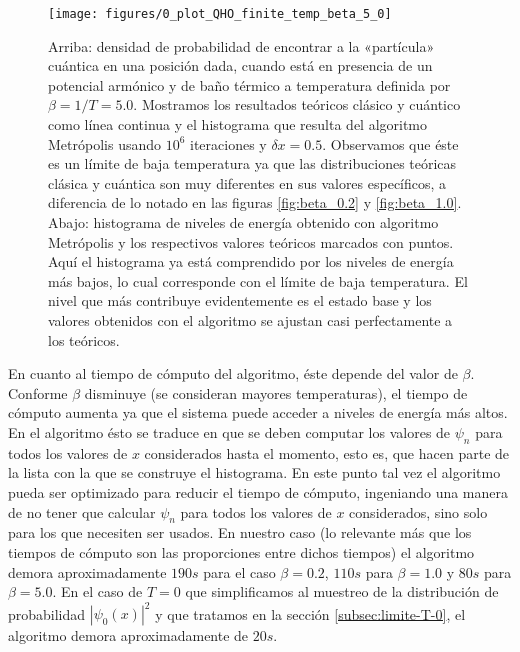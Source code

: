 \documentclass[%
 reprint,
 amsmath,amssymb,
 aps,
 pra,
]{revtex4-2}
\begin{document}
\begin{figure}[t]
	\centering
	\texttt{[image: figures/0\_plot\_QHO\_finite\_temp\_beta\_5\_0]}
	\caption{Arriba: densidad de probabilidad de encontrar a la «partícula» cuántica en una posición dada, cuando está en presencia de un potencial armónico y de baño térmico a temperatura definida por $\beta=1/T=5.0$. Mostramos los resultados teóricos clásico y cuántico como línea continua y el histograma que resulta del algoritmo Metrópolis usando $10^6$ iteraciones y $\delta x = 0.5$. Observamos que éste es un límite de baja temperatura ya que las distribuciones teóricas clásica y cuántica son muy diferentes en sus valores específicos, a diferencia de lo notado en las figuras \ref{fig:beta_0.2} y \ref{fig:beta_1.0}. Abajo: histograma de niveles de energía obtenido con algoritmo Metrópolis y los respectivos valores teóricos marcados con puntos. Aquí el histograma ya está comprendido por los niveles de energía más bajos, lo cual corresponde con el límite de baja temperatura. El nivel que más contribuye evidentemente es el estado base y los valores obtenidos con el algoritmo se ajustan casi perfectamente a los teóricos.}
	\label{fig:beta_5.0}
\end{figure}

En cuanto al tiempo de cómputo del algoritmo, éste depende del valor de $\beta$. Conforme $\beta$ disminuye (se consideran mayores temperaturas), el tiempo de cómputo aumenta ya que el sistema puede acceder a niveles de energía más altos. En el algoritmo ésto se traduce en que se deben computar los valores de $\psi_n$ para todos los valores de $x$ considerados hasta el momento, esto es, que hacen parte de la lista con la que se construye el histograma. En este punto tal vez el algoritmo pueda ser optimizado para reducir el tiempo de cómputo, ingeniando una manera de no tener que calcular $\psi_n$ para todos los valores de $x$ considerados, sino solo para los que necesiten ser usados. En nuestro caso (lo relevante más que los tiempos de cómputo son las proporciones entre dichos tiempos) el algoritmo demora aproximadamente $190s$ para el caso $\beta = 0.2$, $110s$ para $\beta = 1.0$ y $80s$ para $\beta=5.0$. En el caso de $T=0$ que simplificamos al muestreo de la distribución de probabilidad $\left|\psi_0(x)\right|^2$ y que tratamos en la sección \ref{subsec:limite-T-0}, el algoritmo demora aproximadamente de $20s$.
\end{document}
